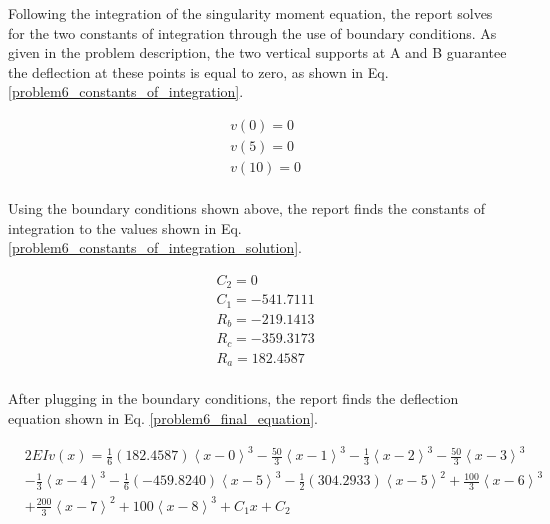 \documentclass[a4paper]{article}
\begin{document}
Following the integration of the singularity moment equation, the report solves for the two constants of integration through the use of boundary conditions. As given in the problem description, the two vertical supports at A and B guarantee the deflection at these points is equal to zero, as shown in Eq. \ref{problem6_constants_of_integration}.

\begin{equation}
\begin{split}
	& v(0) = 0 \\
	& v(5) = 0 \\
	& v(10) = 0 \\
\end{split}
\label{problem6_constants_of_integration}
\end{equation}

Using the boundary conditions shown above, the report finds the constants of integration to the values shown in Eq. \ref{problem6_constants_of_integration_solution}.

\begin{equation}
\begin{split}
	& C_2 = 0 \\
	& C_1 = -541.7111 \\
	& R_b = -219.1413 \\
	& R_c = -359.3173\\
	& R_a = 182.4587\\
\end{split}
\label{problem6_constants_of_integration_solution}
\end{equation}

After plugging in the boundary conditions, the report finds the deflection equation shown in Eq. \ref{problem6_final_equation}.

\begin{equation}
\begin{split}
& 2EI v(x) = \frac{1}{6}\left(182.4587\right)\left<x-0\right>^3 - \frac{50}{3}\left<x-1\right>^3 -  \frac{1}{3}\left<x-2\right>^3 - \frac{50}{3}\left<x-3\right>^3  \\
& - \frac{1}{3}\left<x-4\right>^3 - \frac{1}{6}\left(-459.8240\right)\left<x-5\right>^3 - \frac{1}{2}\left(304.2933\right)\left<x-5\right>^2 + \frac{100}{3}\left<x-6\right>^3  \\
& + \frac{200}{3}\left<x-7\right>^2 + 100\left<x-8\right>^3 + C_1x + C_2 \\
\end{split}
\label{problem6_final_equation}
\end{equation}
\end{document}
